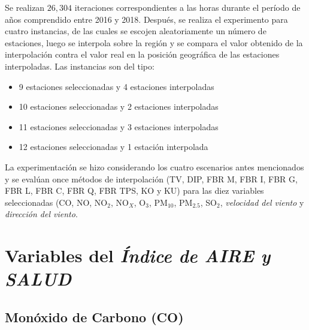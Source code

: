 Se realizan $26, 304$ iteraciones correspondientes a las horas durante el período de años comprendido entre 2016 y 2018. Después, se realiza el experimento para cuatro instancias, de las cuales se escojen aleatoriamente un número de estaciones, luego se interpola sobre la región y se compara el valor obtenido de la interpolación contra el valor real en la posición geográfica de las estaciones interpoladas. Las instancias son del tipo: 
\begin{itemize}
\item 9 estaciones seleccionadas y 4 estaciones interpoladas
\item 10 estaciones seleccionadas y 2 estaciones interpoladas
\item 11 estaciones seleccionadas y 3 estaciones interpoladas
\item 12 estaciones seleccionadas y 1 estación interpolada
\end{itemize}
La experimentación se hizo considerando los cuatro escenarios antes mencionados y se evalúan once métodos de interpolación (TV, DIP, FBR M, FBR I, FBR G, FBR L, FBR C, FBR Q, FBR TPS, KO y KU) para las diez variables seleccionadas (CO, NO, NO$_{2}$, NO$_{X}$, O$_{3}$, PM$_{10}$, PM$_{2.5}$, SO$_{2}$, {\em velocidad del viento} y {\em dirección del viento}.


\section{Variables del {\em Índice de AIRE y SALUD}}

\subsection{Monóxido de Carbono (CO)}


